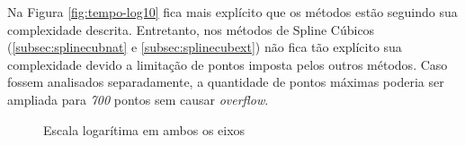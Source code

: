 \documentclass[conference]{IEEEtran}
\begin{document}
Na Figura \ref{fig:tempo-log10} fica mais explícito que os métodos estão seguindo sua complexidade descrita. Entretanto, nos métodos de Spline Cúbicos (\ref{subsec:splinecubnat} e \ref{subsec:splinecubext}) não fica tão explícito sua complexidade devido a limitação de pontos imposta pelos outros métodos. Caso fossem analisados separadamente, a quantidade de pontos máximas poderia ser ampliada para \emph{700} pontos sem causar \emph{overflow}.

\begin{figure}[t]
   \hspace{\fill}
   \hspace{\fill}
  \caption{Escala logarítima em ambos os eixos} 
  \label{fig:tempo-loglog10}
\end{figure}
\end{document}
